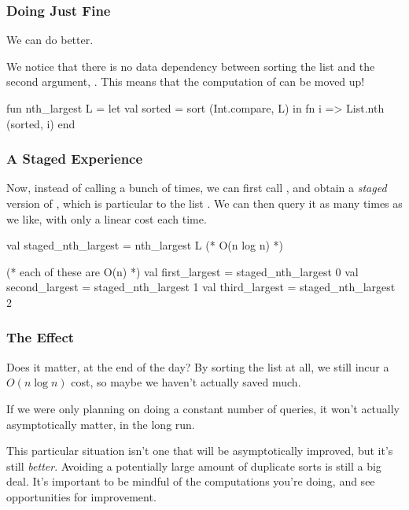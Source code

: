 \documentclass[aspectratio=169]{beamer}
\begin{document}
\begin{frame}[fragile]
  \frametitle{Doing Just Fine}

  We can do better.

  \pause
  \vspace{\fill}

  We notice that there is no data dependency between sorting the list and 
  the second argument, . This means that the computation of
   can be moved up!

  \pause
  \vspace{\fill}

  \begin{codeblock}
    fun nth_largest L = 
      let 
        val sorted = sort (Int.compare, L)
      in
        fn i => List.nth (sorted, i) 
      end
  \end{codeblock}
\end{frame}

\begin{frame}[fragile]
  \frametitle{A Staged Experience}

  Now, instead of calling  a bunch of times, we can first
  call , and obtain a \textit{staged} version of 
  , which is particular to the list . We can then query
  it as many times as we like, with only a linear cost each time.

  \pause
  \vspace{\fill}

  \begin{codeblock}
    val staged_nth_largest = nth_largest L (* O(n log n) *)

    (* each of these are O(n) *)
    val first_largest = staged_nth_largest 0
    val second_largest = staged_nth_largest 1
    val third_largest = staged_nth_largest 2
  \end{codeblock}
\end{frame}

\begin{frame}[fragile]
  \frametitle{The Effect}

  Does it matter, at the end of the day? By sorting the list at all, we still
  incur a $O(n \log n)$ cost, so maybe we haven't actually saved much.

  \pause
  \vspace{\fill}

  If we were only planning on doing a constant number of queries, it won't actually
  asymptotically matter, in the long run.

  \pause
  \vspace{\fill}

  This particular situation isn't one that will be asymptotically improved, but
  it's still \textit{better}. Avoiding a potentially large amount of duplicate
  sorts is still a big deal. It's important to be mindful of the computations
  you're doing, and see opportunities for improvement. 
\end{frame}
\end{document}
